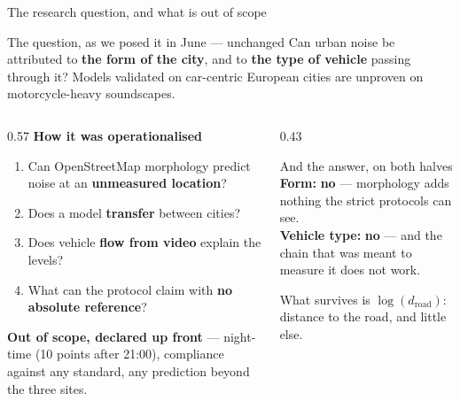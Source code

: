 \documentclass[aspectratio=169,10pt]{beamer}
\newcommand{\up}[1]{\textcolor{good}{\textbf{#1}}}
\newcommand{\down}[1]{\textcolor{bad}{\textbf{#1}}}
\begin{document}
\begin{frame}{The research question, and what is out of scope}
  \begin{alertblock}{The question, as we posed it in June --- unchanged}
    Can urban noise be attributed to \textbf{the form of the city}, and to
    \textbf{the type of vehicle} passing through it? Models validated on
    car-centric European cities are unproven on motorcycle-heavy soundscapes.
  \end{alertblock}
  \vspace{.2em}
  \begin{columns}[T]
    \begin{column}{0.57\textwidth}
      \textbf{How it was operationalised}
      \begin{enumerate}
        \item Can OpenStreetMap morphology predict noise at an
              \textbf{unmeasured location}?
        \item Does a model \textbf{transfer} between cities?
        \item Does vehicle \textbf{flow from video} explain the levels?
        \item What can the protocol claim with \textbf{no absolute reference}?
      \end{enumerate}
      \vspace{.3em}
      \textbf{Out of scope, declared up front} --- night-time (10 points after
      21:00), compliance against any standard, any prediction beyond the three
      sites.
    \end{column}
    \begin{column}{0.43\textwidth}
      \begin{exampleblock}{And the answer, on both halves}
        \textbf{Form:} \down{no} --- morphology adds nothing the strict protocols
        can see.\\[.3em]
        \textbf{Vehicle type:} \down{no} --- and the chain that was meant to
        measure it does not work.
        \vspace{.3em}

        What survives is \up{$\log(d_\mathrm{road})$}: distance to the road, and
        little else.
      \end{exampleblock}
    \end{column}
  \end{columns}
\end{frame}
\end{document}
